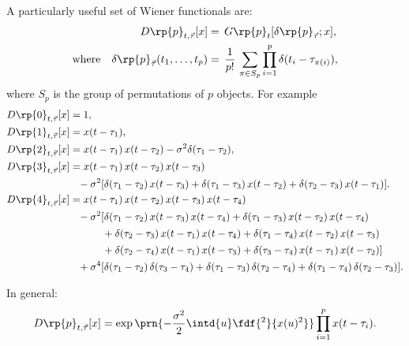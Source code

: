 \documentclass[12pt]{article}
\newcommand{\contd}[1][=]{\phantom{#1}\mathord{}}
\begin{document}
A particularly useful set of Wiener functionals are:
%
\begin{equation}\label{eq:wienerdelta}
  \begin{aligned}
    D\rp{p}_{t,\vec{\tau}}[x] &= \, G\rp{p}_t[\delta\rp{p}_{\vec{\tau}};x], \\ \text{where}\quad
    \delta\rp{p}_{\vec{\tau}}(t_1,\ldots,t_p) &= \, \frac{1}{p!}\,\sum_{\pi\in S_p} \prod_{i=1}^p \delta(t_i-\tau_{\pi(i)}),
  \end{aligned}
\end{equation}
%
where $S_p$ is the group of permutations of $p$ objects.
For example
%
\begin{equation}\label{eq:wienerdeltaex}
  \begin{aligned}
    D\rp{0}_{t,\vec{\tau}}[x] &= 1, \\
    D\rp{1}_{t,\vec{\tau}}[x] &= x(t-\tau_1), \\
    D\rp{2}_{t,\vec{\tau}}[x]
      &= x(t-\tau_1)\,x(t-\tau_2) - \sigma^2\delta(\tau_1-\tau_2), \\
    D\rp{3}_{t,\vec{\tau}}[x]
      &= x(t-\tau_1)\,x(t-\tau_2)\,x(t-\tau_3) \\
      &\contd - \sigma^2 [\delta(\tau_1-\tau_2)\,x(t-\tau_3)
        + \delta(\tau_1-\tau_3)\,x(t-\tau_2)
        + \delta(\tau_2-\tau_3)\,x(t-\tau_1) ]. \\
    D\rp{4}_{t,\vec{\tau}}[x]
      &= x(t-\tau_1)\,x(t-\tau_2)\,x(t-\tau_3)\,x(t-\tau_4) \\
      &\contd
        - \sigma^2 [\delta(\tau_1-\tau_2)\,x(t-\tau_3)\,x(t-\tau_4)
        + \delta(\tau_1-\tau_3)\,x(t-\tau_2)\,x(t-\tau_4) \\
      &\contd[=-\sigma^2[]
        + \delta(\tau_2-\tau_3)\,x(t-\tau_1)\,x(t-\tau_4)
        + \delta(\tau_1-\tau_4)\,x(t-\tau_2)\,x(t-\tau_3) \\
      &\contd[=-\sigma^2[]
        + \delta(\tau_2-\tau_4)\,x(t-\tau_1)\,x(t-\tau_3)
        +     \delta(\tau_3-\tau_4)\,x(t-\tau_1)\,x(t-\tau_2) ] \\
      &\contd
        + \sigma^4 [ \delta(\tau_1-\tau_2)\,\delta(\tau_3-\tau_4)
        + \delta(\tau_1-\tau_3)\,\delta(\tau_2-\tau_4)
        + \delta(\tau_1-\tau_4)\,\delta(\tau_2-\tau_3) ].
  \end{aligned}
\end{equation}
%
\begin{rem}
  In general:
  \begin{equation}\label{eq:wienerdeltagen}
    D\rp{p}_{t,\vec{\tau}}[x] = \exp\prn{-\frac{\sigma^2}{2}\intd{u}\fdf{^2}{x(u)^2}}
        \prod_{i=1}^p x(t-\tau_i).
  \end{equation}
\end{rem}
\end{document}
